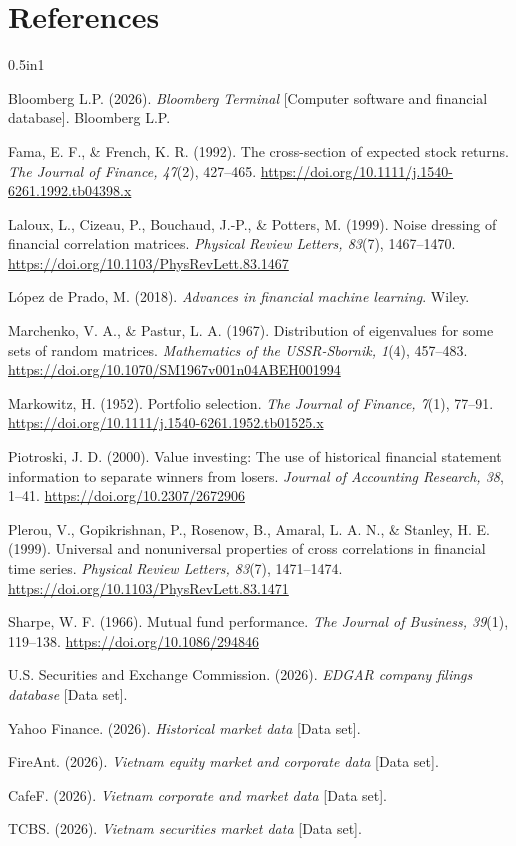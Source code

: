 \documentclass[11pt,a4paper]{report}
\numberwithin{figure}{chapter}
\numberwithin{table}{chapter}
\numberwithin{equation}{chapter}
\begin{document}
\chapter*{References}

\begin{hangparas}{0.5in}{1}

Bloomberg L.P. (2026). \textit{Bloomberg Terminal} [Computer software and financial database]. Bloomberg L.P.

Fama, E. F., \& French, K. R. (1992). The cross-section of expected stock returns. \textit{The Journal of Finance, 47}(2), 427--465. \url{https://doi.org/10.1111/j.1540-6261.1992.tb04398.x}

Laloux, L., Cizeau, P., Bouchaud, J.-P., \& Potters, M. (1999). Noise dressing of financial correlation matrices. \textit{Physical Review Letters, 83}(7), 1467--1470. \url{https://doi.org/10.1103/PhysRevLett.83.1467}

L\'opez de Prado, M. (2018). \textit{Advances in financial machine learning}. Wiley.

Marchenko, V. A., \& Pastur, L. A. (1967). Distribution of eigenvalues for some sets of random matrices. \textit{Mathematics of the USSR-Sbornik, 1}(4), 457--483. \url{https://doi.org/10.1070/SM1967v001n04ABEH001994}

Markowitz, H. (1952). Portfolio selection. \textit{The Journal of Finance, 7}(1), 77--91. \url{https://doi.org/10.1111/j.1540-6261.1952.tb01525.x}

Piotroski, J. D. (2000). Value investing: The use of historical financial statement information to separate winners from losers. \textit{Journal of Accounting Research, 38}, 1--41. \url{https://doi.org/10.2307/2672906}

Plerou, V., Gopikrishnan, P., Rosenow, B., Amaral, L. A. N., \& Stanley, H. E. (1999). Universal and nonuniversal properties of cross correlations in financial time series. \textit{Physical Review Letters, 83}(7), 1471--1474. \url{https://doi.org/10.1103/PhysRevLett.83.1471}

Sharpe, W. F. (1966). Mutual fund performance. \textit{The Journal of Business, 39}(1), 119--138. \url{https://doi.org/10.1086/294846}

U.S. Securities and Exchange Commission. (2026). \textit{EDGAR company filings database} [Data set].

Yahoo Finance. (2026). \textit{Historical market data} [Data set].

FireAnt. (2026). \textit{Vietnam equity market and corporate data} [Data set].

CafeF. (2026). \textit{Vietnam corporate and market data} [Data set].

TCBS. (2026). \textit{Vietnam securities market data} [Data set].

\end{hangparas}
\end{document}
